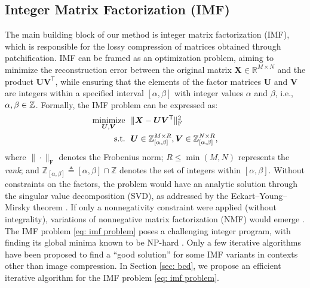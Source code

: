 \subsection{Integer Matrix Factorization (IMF)} \label{sec: imf}

The main building block of our method is integer matrix factorization (IMF), which is responsible for the lossy compression of matrices obtained through patchification. IMF can be framed as an optimization problem, aiming to minimize the reconstruction error between the original matrix $\bm{X} \in \mathbb{R}^{M \times N}$ and the product $\bm{U} \bm{V}^\mathsf{T}$, while ensuring that the elements of the factor matrices $\bm{U}$ and $\bm{V}$ are integers within a specified interval $[\alpha,\beta]$ with integer values $\alpha$ and $\beta$, i.e., $\alpha,\beta\in\mathbb Z$. Formally, the IMF problem can be expressed as:
\begin{align} \label{eq: imf problem}
	\operatorname*{minimize}_{\bm{U}, \bm{V}} & \ \  \| \bm{X} - \bm{U} \bm{V}^\mathsf{T} \|_\text{F}^2 \nonumber \\
	\text{s.t.}           & \ \ \bm{U} \in \mathbb{Z}_{[\alpha,\beta]}^{M \times R}, \bm{V} \in \mathbb{Z}_{[\alpha,\beta]}^{N \times R},
\end{align}
where $\|\cdot\|_\text{F}$ denotes the Frobenius norm; $R \leq \min(M,N)$ represents the \emph{rank}; and $\mathbb{Z}_{[\alpha,\beta]} \triangleq [\alpha,\beta] \cap \mathbb{Z}$ denotes the set of integers within $[\alpha,\beta]$. Without constraints on the factors, the problem would have an analytic solution through the singular value decomposition (SVD), as addressed by the Eckart–Young–Mirsky theorem \cite{eckart1936approximation}. If only a nonnegativity constraint were applied (without integrality), variations of nonnegative matrix factorization (NMF) would emerge \cite{lee2000algorithms, gillis2020nonnegative}. The IMF problem \eqref{eq: imf problem} poses a challenging integer program, with finding its global minima known to be NP-hard \cite{dong2018integer, van1981another}. Only a few iterative algorithms \cite{dong2018integer, lin2005integer} have been proposed to find a ``good solution'' for some IMF variants in contexts other than image compression. In Section \ref{sec: bcd}, we propose an efficient iterative algorithm for the IMF problem \eqref{eq: imf problem}.

